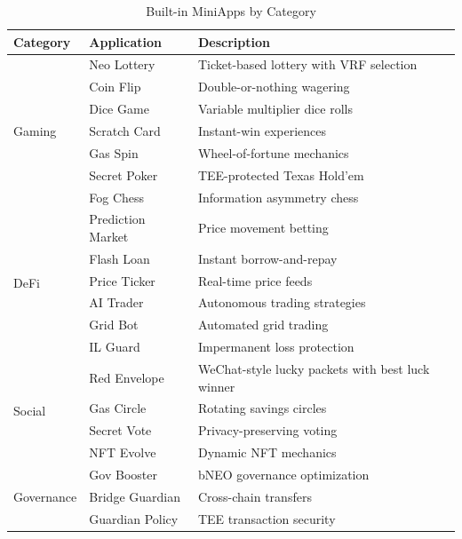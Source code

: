 \documentclass[11pt,a4paper]{article}
\begin{document}
\begin{table}[h]
\centering
\caption{Built-in MiniApps by Category}
\begin{tabular}{@{}llp{6cm}@{}}
\toprule
\textbf{Category} & \textbf{Application} & \textbf{Description} \\
\midrule
\multirow{7}{*}{Gaming} & Neo Lottery & Ticket-based lottery with VRF selection \\
 & Coin Flip & Double-or-nothing wagering \\
 & Dice Game & Variable multiplier dice rolls \\
 & Scratch Card & Instant-win experiences \\
 & Gas Spin & Wheel-of-fortune mechanics \\
 & Secret Poker & TEE-protected Texas Hold'em \\
 & Fog Chess & Information asymmetry chess \\
\midrule
\multirow{6}{*}{DeFi} & Prediction Market & Price movement betting \\
 & Flash Loan & Instant borrow-and-repay \\
 & Price Ticker & Real-time price feeds \\
 & AI Trader & Autonomous trading strategies \\
 & Grid Bot & Automated grid trading \\
 & IL Guard & Impermanent loss protection \\
\midrule
\multirow{4}{*}{Social} & Red Envelope & WeChat-style lucky packets with best luck winner \\
 & Gas Circle & Rotating savings circles \\
 & Secret Vote & Privacy-preserving voting \\
 & NFT Evolve & Dynamic NFT mechanics \\
\midrule
\multirow{3}{*}{Governance} & Gov Booster & bNEO governance optimization \\
 & Bridge Guardian & Cross-chain transfers \\
 & Guardian Policy & TEE transaction security \\
\bottomrule
\end{tabular}
\label{tab:miniapps}
\end{table}
\end{document}
